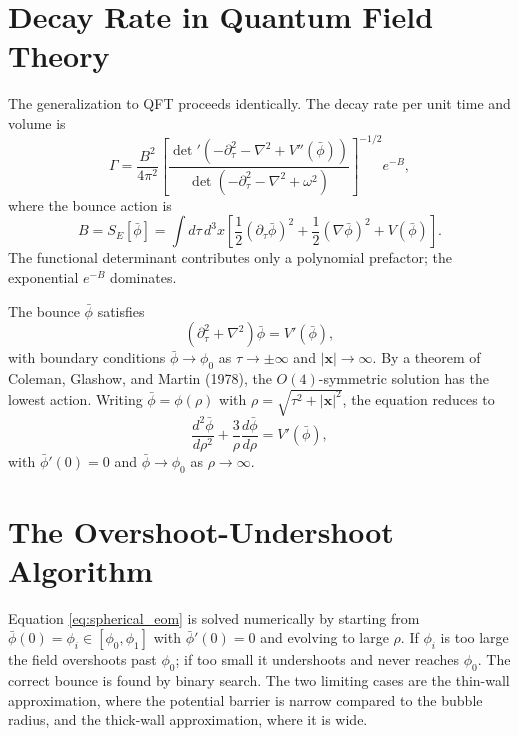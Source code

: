 \section{Decay Rate in Quantum Field Theory}

The generalization to QFT proceeds identically. The decay rate per
unit time and volume is
\begin{equation}
	\Gamma = \frac{B^2}{4\pi^2}
	\left[\frac{\det'(-\partial_\tau^2-\nabla^2+V''(\bar\phi))}
		{\det(-\partial_\tau^2-\nabla^2+\omega^2)}\right]^{-1/2}e^{-B},
\end{equation}
where the bounce action is
\begin{equation}
	B = S_E[\bar\phi] = \int d\tau\,d^3x\left[
		\frac{1}{2}(\partial_\tau\bar\phi)^2
		+ \frac{1}{2}(\nabla\bar\phi)^2
		+ V(\bar\phi)\right].
\end{equation}
The functional determinant contributes only a polynomial prefactor;
the exponential $e^{-B}$ dominates.

The bounce $\bar\phi$ satisfies
\begin{equation}
	(\partial_\tau^2 + \nabla^2)\bar\phi = V'(\bar\phi),
	\label{eq:bounce_eom}
\end{equation}
with boundary conditions $\bar\phi \to \phi_0$ as
$\tau \to \pm\infty$ and $|\mathbf{x}| \to \infty$. By a theorem of
Coleman, Glashow, and Martin (1978), the $O(4)$-symmetric solution
has the lowest action. Writing $\bar\phi = \phi(\rho)$ with
$\rho = \sqrt{\tau^2 + |\mathbf{x}|^2}$, the equation reduces to
\begin{equation}
	\frac{d^2\bar\phi}{d\rho^2}
	+ \frac{3}{\rho}\frac{d\bar\phi}{d\rho} = V'(\bar\phi),
	\label{eq:spherical_eom}
\end{equation}
with $\bar\phi'(0) = 0$ and $\bar\phi \to \phi_0$ as
$\rho \to \infty$.

\section{The Overshoot-Undershoot Algorithm}

Equation \eqref{eq:spherical_eom} is solved numerically by starting
from $\bar\phi(0) = \phi_i \in [\phi_0, \phi_1]$ with
$\bar\phi'(0) = 0$ and evolving to large $\rho$. If $\phi_i$ is too
large the field overshoots past $\phi_0$; if too small it undershoots
and never reaches $\phi_0$. The correct bounce is found by binary
search. The two limiting cases are the thin-wall approximation, where
the potential barrier is narrow compared to the bubble radius, and the
thick-wall approximation, where it is wide.


